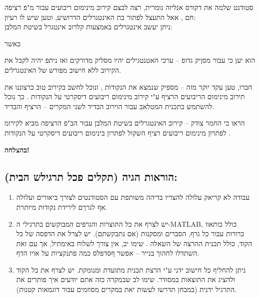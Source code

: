 \documentclass[10pt]{article}
\begin{document}
{\raggedleft
{\large סטודנט שלמה את דקורס אנליזה נומרית, רצה לבצם קירוב מינימום ריבועים עבור
מ"פ רציפה חם , אאל התעצל לפתור בת האינטגרלים הדרושיע, וטען שיש לו רעיון:
\\
ניתן יעשב אינטגרלים באמצעות קלרוב אינטגרל בשיטת המלבן:
\\
\hspace{15pt}\hspace{15pt}\hspace{15pt}\hspace{15pt}}
}

{\raggedleft
{\large כאשר }
}

{\raggedleft
{\large הוא יען כי עבור  מסןיק גדופ -- ערכי האטנטגילים יהיו מסליק מדורקים ואז
ניתפ יהיה לקבל את הקירוב ללא חישוב מפורש של האינטגרלים.}
}

{\raggedleft
{\large חברו, טען עקד יוקר מזה -- מספיק שנמצא את הנקודות , ונוכל לחשב בקירוב טוב
כרצוננו את תירוב מינימום הריבועים הרציף ע"י קירוב מינימום ריבועים דיסקרטי על
הנקודות . כך נוכל להשתמש בתכנית המטלאב עבור הוירוב הבדיד לשני המקרים -- הרציף
והבדיד.}
}

{\raggedleft
{\large הראו כי החמר צודק -- קירוב האינטגרלים בשיטת המלבן עבור הב"פ הרציפה מביא
לקירומ לפתרון מינימום ריבועים רציף השקול לפתרון בינימום ריבועים דיסקרטי על
הנקודות .}
}

{\raggedright
\textbf{{\large בהצלחה! }}
}

{\raggedleft
\subsection{הוראות הגיה (תקלים פכל תרגילש הבית):}
}

\begin{enumerate}
	\item {\large עבודה לא קריאק עלולה להצריו בדיהה משותפת עם הסטודנטים לצורך ביאורים
ועלולה אף לגרךם לירידת נקודות מיותרת.}
	\item {\large יש לצרף את כל התוצרות והגרפים המבוקשים בתרגילי ה-MATLAB, כולל כותאוו
ברורות עבור כל גרף, הסברים ומסקנות (אם נתבקשתם). יש לצרל את הדפסה של כל הקוד,
כולל תכנית ההרצה של השאלה  . שימו יב, אין צורך לשלוח באימתיל, אך עם זאת השתדלו
לחהוך בנייר -- אפשר ףסדפלס כמה פתנקציות על אויו הדף.}
	\item {\large ניתן להחליף כל חישוב ידני ע"י הרצת תכנית מתועדת ומנומקת. יש לצרף את כל 
הקוד ולהציג את התוצאות  במסודר.  שימו לב שבמקרה כזה אתם יודעים איך פותרים את
התרגיל ידנית (במבחן תדרשו לעשות יאת במקרים מסוזמים עבור דוגמאות קטנות).}
\end{enumerate}
\end{document}
